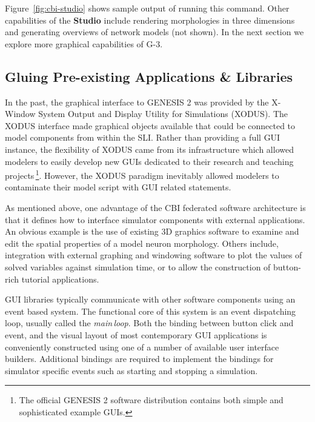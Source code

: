 \documentclass[12pt]{article}
\begin{document}
Figure~\ref{fig:cbi-studio} shows sample output of running this
command.  Other capabilities of the {\bf Studio} include rendering
morphologies in three dimensions and generating overviews of network
models (not shown).  In the next section we explore more graphical
capabilities of G-3.

\subsection{Gluing Pre-existing Applications \& Libraries}

In the past, the graphical interface to GENESIS 2 was provided by the
X-Window System Output and Display Utility for Simulations (XODUS).  The
XODUS interface made graphical objects available that could be
connected to model components from within the SLI.  Rather than
providing a full GUI instance, the flexibility of XODUS came from its
infrastructure which allowed modelers to easily develop new GUIs
dedicated to their research and teaching projects\,\footnote{The
  official GENESIS 2 software distribution contains both simple and
  sophisticated example GUIs.}.  However, the XODUS paradigm
inevitably allowed modelers to contaminate their model script with GUI
related statements.

As mentioned above, one advantage of the CBI federated software
architecture is that it defines how to interface simulator components
with external applications.  An obvious example is the use of existing
3D graphics software to examine and edit the spatial properties of a
model neuron morphology.  Others include, integration with external
graphing and windowing software to plot the values of solved
variables against simulation time, or to allow the construction of
button-rich tutorial applications.

GUI libraries typically communicate with other software components
using an event based system.  The functional core of this system is an
event dispatching loop, usually called the {\it main\,loop}.
Both the binding between button click and event, and the visual layout
of most contemporary GUI applications is conveniently constructed
using one of a number of available user interface builders.
Additional bindings are required to implement the bindings for
simulator specific events such as starting and stopping a simulation.
\end{document}
